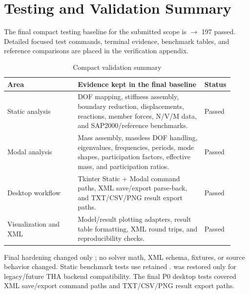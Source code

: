 \section{Testing and Validation Summary}

The final compact testing baseline for the submitted scope is  \(\rightarrow\) 197 passed. Detailed focused test commands, terminal evidence, benchmark tables, and reference comparisons are placed in the verification appendix.

\begin{table}[htbp]
\centering
\caption{Compact validation summary}
\begin{tabular}{p{0.30\linewidth}p{0.54\linewidth}p{0.08\linewidth}}
\toprule
Area & Evidence kept in the final baseline & Status \\
\midrule
Static analysis & DOF mapping, stiffness assembly, boundary reduction, displacements, reactions, member forces, N/V/M data, and SAP2000/reference benchmarks. & Passed \\
Modal analysis & Mass assembly, massless DOF handling, eigenvalues, frequencies, periods, mode shapes, participation factors, effective mass, and participation ratios. & Passed \\
Desktop workflow & Tkinter Static + Modal command paths, XML save/export parse-back, and TXT/CSV/PNG result export paths. & Passed \\
Visualization and XML & Model/result plotting adapters, result table formatting, XML round trips, and reproducibility checks. & Passed \\
\bottomrule
\end{tabular}
\end{table}

Final hardening changed only ; no solver math, XML schema, fixtures, or source behavior changed. Static benchmark tests use retained .  was restored only for legacy/future THA backend compatibility. The final P0 desktop tests covered XML save/export command paths and TXT/CSV/PNG result export paths.
